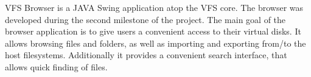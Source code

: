 \documentclass[a4paper,12pt]{article}
\begin{document}


VFS Browser is a JAVA Swing application atop the VFS core. The browser was
developed during the second milestone of the project. The main goal of the
browser application is to give users a convenient access to their virtual disks.
It allows browsing files and folders, as well as importing and
exporting from/to the host filesystems. Additionally it provides a convenient
search interface, that allows quick finding of files.



















\end{document}
